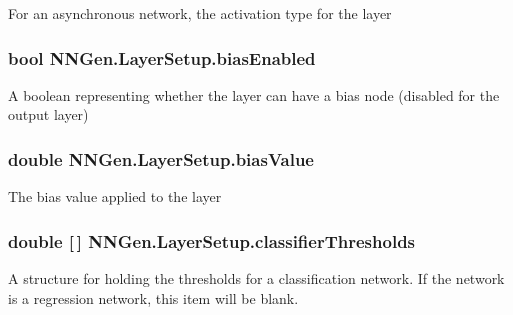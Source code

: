 For an asynchronous network, the activation type for the layer 

\hypertarget{class_n_n_gen_1_1_layer_setup_aba1fd67f0b1f840794b46dcd3626e05f}{}
\subsubsection[{bias\+Enabled}]{\setlength{\rightskip}{0pt plus 5cm}bool N\+N\+Gen.\+Layer\+Setup.\+bias\+Enabled\hspace{0.3cm}{\ttfamily [get]}}\label{class_n_n_gen_1_1_layer_setup_aba1fd67f0b1f840794b46dcd3626e05f}


A boolean representing whether the layer can have a bias node (disabled for the output layer) 

\hypertarget{class_n_n_gen_1_1_layer_setup_a44fec12782544a7b0ec9f9705251ebaf}{}
\subsubsection[{bias\+Value}]{\setlength{\rightskip}{0pt plus 5cm}double N\+N\+Gen.\+Layer\+Setup.\+bias\+Value\hspace{0.3cm}{\ttfamily [get]}}\label{class_n_n_gen_1_1_layer_setup_a44fec12782544a7b0ec9f9705251ebaf}


The bias value applied to the layer 

\hypertarget{class_n_n_gen_1_1_layer_setup_afd7deda67d710ebec7628b2eec8f484b}{}
\subsubsection[{classifier\+Thresholds}]{\setlength{\rightskip}{0pt plus 5cm}double \mbox{[}$\,$\mbox{]} N\+N\+Gen.\+Layer\+Setup.\+classifier\+Thresholds\hspace{0.3cm}{\ttfamily [get]}}\label{class_n_n_gen_1_1_layer_setup_afd7deda67d710ebec7628b2eec8f484b}


A structure for holding the thresholds for a classification network. If the network is a regression network, this item will be blank. 

